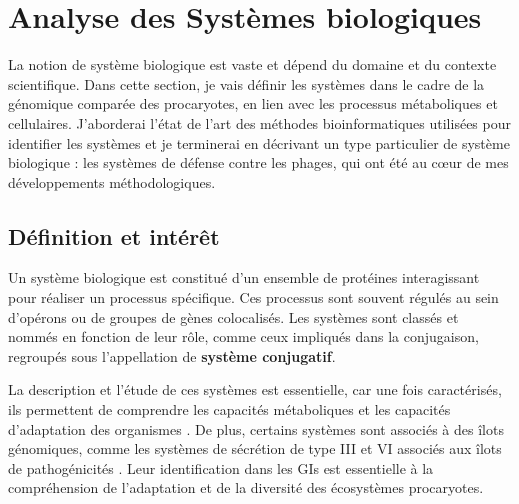 \section{Analyse des Systèmes biologiques}
\label{sec:sys_bio}

La notion de système biologique est vaste et dépend du domaine et du contexte scientifique. Dans cette section, je vais définir les systèmes dans le cadre de la génomique comparée des procaryotes, en lien avec les processus métaboliques et cellulaires. J'aborderai l'état de l'art des méthodes bioinformatiques utilisées pour identifier les systèmes et je terminerai en décrivant un type particulier de système biologique : les systèmes de défense contre les phages, qui ont été au c\oe ur de mes développements méthodologiques.

\subsection{Définition et intérêt}

Un système biologique est constitué d’un ensemble de protéines interagissant pour réaliser un processus spécifique. Ces processus sont souvent régulés au sein d’opérons ou de groupes de gènes colocalisés. Les systèmes sont classés et nommés en fonction de leur rôle, comme ceux impliqués dans la conjugaison, regroupés sous l’appellation de \textbf{système conjugatif}.

La description et l'étude de ces systèmes est essentielle, car une fois caractérisés, ils permettent de comprendre les capacités métaboliques et les capacités d'adaptation des organismes \cite{alberts_cell_1998}. De plus, certains systèmes sont associés à des îlots génomiques, comme les systèmes de sécrétion de type III et VI associés aux îlots de pathogénicités \cite{pallen_bacterial_2007}. Leur identification dans les GIs est essentielle à la compréhension de l'adaptation et de la diversité des écosystèmes procaryotes. 

